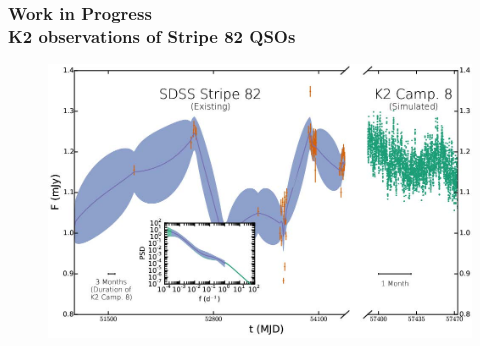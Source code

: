 \documentclass[hyperref={pdfpagelabels=false}]{beamer}
\begin{document}
\begin{frame}
\frametitle{Work in Progress\\K2 observations of Stripe 82 QSOs}
        \begin{figure}
          \includegraphics[scale=0.20]{images/LC_2.jpg}
        \end{figure}
\end{frame}
\end{document}
